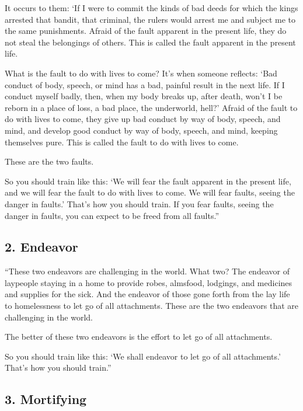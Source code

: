 \documentclass[12pt,openany]{book}%
\begin{document}
It occurs to them: ‘If I were to commit the kinds of bad deeds for which the kings arrested that bandit, that criminal, the rulers would arrest me and subject me to the same punishments. Afraid of the fault apparent in the present life, they do not steal the belongings of others. This is called the fault apparent in the present life. 

What is the fault to do with lives to come? It’s when someone reflects: ‘Bad conduct of body, speech, or mind has a bad, painful result in the next life. If I conduct myself badly, then, when my body breaks up, after death, won’t I be reborn in a place of loss, a bad place, the underworld, hell?’ Afraid of the fault to do with lives to come, they give up bad conduct by way of body, speech, and mind, and develop good conduct by way of body, speech, and mind, keeping themselves pure. This is called the fault to do with lives to come. 

These are the two faults. 

So you should train like this: ‘We will fear the fault apparent in the present life, and we will fear the fault to do with lives to come. We will fear faults, seeing the danger in faults.’ That’s how you should train. If you fear faults, seeing the danger in faults, you can expect to be freed from all faults.” 

\subsection*{2. Endeavor }

“These two endeavors are challenging in the world. What two? The endeavor of laypeople staying in a home to provide robes, almsfood, lodgings, and medicines and supplies for the sick. And the endeavor of those gone forth from the lay life to homelessness to let go of all attachments. These are the two endeavors that are challenging in the world. 

The better of these two endeavors is the effort to let go of all attachments. 

So you should train like this: ‘We shall endeavor to let go of all attachments.’ That’s how you should train.” 

\subsection*{3. Mortifying }
\end{document}
